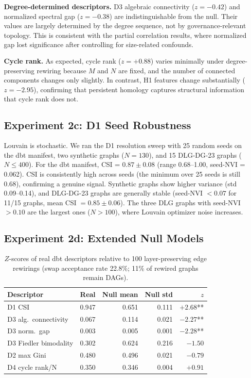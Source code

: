 \documentclass[11pt,a4paper]{article}
\begin{document}
\textbf{Degree-determined descriptors.} D3 algebraic connectivity
($z = -0.42$) and normalized spectral gap ($z = -0.38$) are
indistinguishable from the null. Their values are largely determined by
the degree sequence, not by governance-relevant topology. This is
consistent with the partial correlation results, where normalized gap
lost significance after controlling for size-related confounds.

\textbf{Cycle rank.} As expected, cycle rank ($z = +0.88$) varies
minimally under degree-preserving rewiring because $M$ and $N$ are
fixed, and the number of connected components changes only slightly.
In contrast, H1 features change substantially ($z = -2.95$),
confirming that persistent homology captures structural information
that cycle rank does not.

\subsection{Experiment 2c: D1 Seed Robustness}

Louvain is stochastic. We ran the D1 resolution sweep with 25 random
seeds on the dbt manifest, two synthetic graphs ($N = 130$), and 15
DLG-DG-23 graphs ($N \leq 400$). For the dbt manifest, CSI = $0.87
\pm 0.08$ (range 0.68--1.00, seed-NVI = 0.062). CSI is consistently
high across seeds (the minimum over 25 seeds is still 0.68), confirming
a genuine signal. Synthetic graphs show higher variance (std 0.09--0.14),
and DLG-DG-23 graphs are generally stable (seed-NVI $< 0.07$ for 11/15
graphs, mean CSI $= 0.85 \pm 0.06$). The three DLG graphs with
seed-NVI $> 0.10$ are the largest ones ($N > 100$), where Louvain
optimizer noise increases.

\subsection{Experiment 2d: Extended Null Models}

\begin{table}[htb]
\centering
\caption{$Z$-scores of real dbt descriptors relative to 100
  layer-preserving edge rewirings (swap acceptance rate 22.8\%;
  11\% of rewired graphs remain DAGs).}
\label{tab:null_layer}
\begin{tabular}{lrrrr}
\toprule
Descriptor & Real & Null mean & Null std & $z$ \\
\midrule
D1 CSI & 0.947 & 0.651 & 0.111 & $+2.68$** \\
D3 alg.\ connectivity & 0.067 & 0.114 & 0.021 & $-2.27$** \\
D3 norm.\ gap & 0.003 & 0.005 & 0.001 & $-2.28$** \\
D3 Fiedler bimodality & 0.302 & 0.624 & 0.216 & $-1.50$ \\
D2 max Gini & 0.480 & 0.496 & 0.021 & $-0.79$ \\
D4 cycle rank/N & 0.350 & 0.346 & 0.004 & $+0.91$ \\
\bottomrule
\end{tabular}
\end{table}
\end{document}
